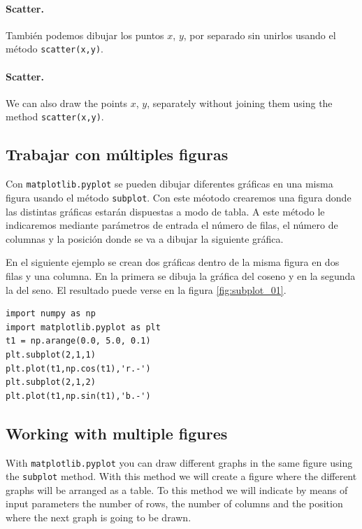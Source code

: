 \begin{paracol}{2}
    \paragraph{Scatter.} También podemos dibujar los puntos $x$, $y$, por separado sin unirlos usando el método \texttt{scatter(x,y)}. 
    \switchcolumn
    \paragraph{Scatter.} We can also draw the points $x$, $y$, separately without joining them using the method \texttt{scatter(x,y)}. 
\end{paracol}

\begin{paracol}{2}
\subsection{Trabajar con múltiples figuras}
Con \texttt{matplotlib.pyplot} se pueden dibujar diferentes gráficas en una misma figura usando el método \texttt{subplot}. Con este méotodo crearemos una figura donde las distintas gráficas estarán dispuestas a modo de tabla. A este método le indicaremos mediante parámetros de entrada el número de filas, el número de columnas y la posición donde se va a dibujar la siguiente gráfica.

En el siguiente ejemplo se crean dos gráficas dentro de la misma figura en dos filas y una columna. En la primera se dibuja la gráfica del coseno y en la segunda la del seno. El resultado puede verse en la figura \ref{fig:subplot_01}.

\begin{verbatim}
import numpy as np
import matplotlib.pyplot as plt
t1 = np.arange(0.0, 5.0, 0.1)
plt.subplot(2,1,1)
plt.plot(t1,np.cos(t1),'r.-')
plt.subplot(2,1,2)
plt.plot(t1,np.sin(t1),'b.-')
\end{verbatim}

\switchcolumn

\subsection{Working with multiple figures}
With \texttt{matplotlib.pyplot} you can draw different graphs in the same figure using the \texttt{subplot} method. With this method we will create a figure where the different graphs will be arranged as a table. To this method we will indicate by means of input parameters the number of rows, the number of columns and the position where the next graph is going to be drawn.


\end{paracol}
